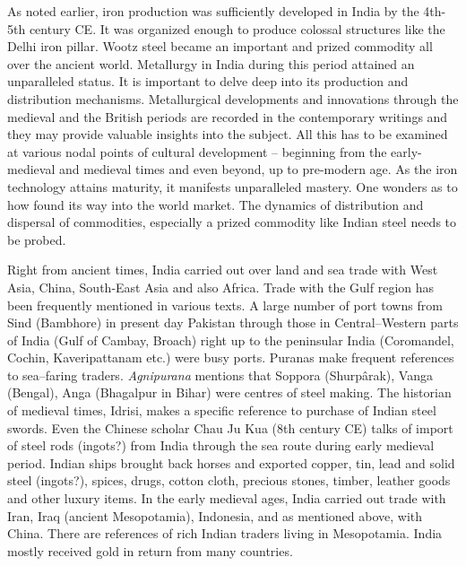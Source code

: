 As noted earlier, iron production was sufficiently developed in India by the 4th-5th century CE. It was organized enough to produce colossal structures like the Delhi iron pillar. Wootz steel became an important and prized commodity all over the ancient world. Metallurgy in India during this period attained an unparalleled status. It is important to delve deep into its production and distribution mechanisms. Metallurgical developments and innovations through the medieval and the British periods are recorded in the contemporary writings and they may provide valuable insights into the subject. All this has to be examined at various nodal points of cultural development – beginning from the early-medieval and medieval times and even beyond, up to pre-modern age. As the iron technology attains maturity, it manifests unparalleled mastery. One wonders as to how found its way into the world market. The dynamics of distribution and dispersal of commodities, especially a prized commodity like Indian steel needs to be probed.

Right from ancient times, India carried out over land and sea trade with West Asia, China, South-East Asia and also Africa. Trade with the Gulf region has been frequently mentioned in various texts. A large number of port towns from Sind (Bambhore) in present day Pakistan through those in Central–Western parts of India (Gulf of Cambay, Broach) right up to the peninsular India (Coromandel, Cochin, Kaveripattanam etc.) were busy ports. Puranas make frequent references to sea–faring traders. \textit{Agnipurana} mentions that Soppora (Shurpârak), Vanga (Bengal), Anga (Bhagalpur in Bihar) were centres of steel making. The historian of medieval times, Idrisi, makes a specific reference to purchase of Indian steel swords. Even the Chinese scholar Chau Ju Kua (8th century CE) talks of import of steel rods (ingots?) from India through the sea route during early medieval period. Indian ships brought back horses and exported copper, tin, lead and solid steel (ingots?), spices, drugs, cotton cloth, precious stones, timber, leather goods and other luxury items. In the early medieval ages, India carried out trade with Iran, Iraq (ancient Mesopotamia), Indonesia, and as mentioned above, with China. There are references of rich Indian traders living in Mesopotamia. India mostly received gold in return from many countries.

